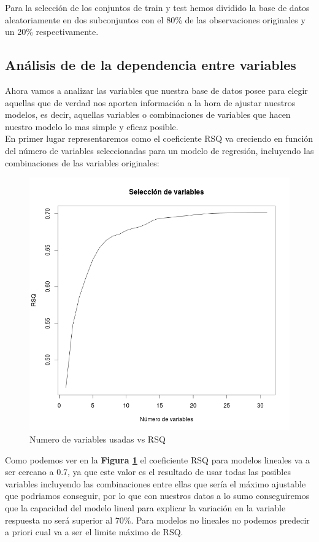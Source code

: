 Para la selección de los conjuntos de train y test hemos dividido la base de datos aleatoriamente en dos subconjuntos con el 80\% de las observaciones originales y un 20\% respectivamente.



\subsection{Análisis de de la dependencia entre variables}

Ahora vamos a analizar las variables que nuestra base de datos posee para elegir aquellas que de verdad nos aporten información a la hora de ajustar nuestros modelos, es decir, aquellas variables o combinaciones de variables que hacen nuestro modelo lo mas simple y eficaz posible.\\

En primer lugar representaremos como el coeficiente RSQ va creciendo en función del número de variables seleccionadas para un modelo de regresión, incluyendo las combinaciones de las variables originales:

\begin{figure}[H]
\centering
\includegraphics[scale=0.40]{Seleccion_variables.png}
\caption{Numero de variables usadas vs RSQ}
\label{sv}
\end{figure}

Como podemos ver en la \textbf{Figura \ref{sv}}  el coeficiente RSQ para modelos lineales va a ser cercano a 0.7, ya que este valor es el resultado de usar todas las posibles variables incluyendo las combinaciones entre ellas que sería el máximo ajustable que podriamos conseguir, por lo que con nuestros datos a lo sumo conseguiremos que la capacidad del modelo lineal para explicar la variación en la variable respuesta no será superior al 70\%. Para modelos no lineales no podemos predecir a priori cual va a ser el limite máximo de RSQ.\\


